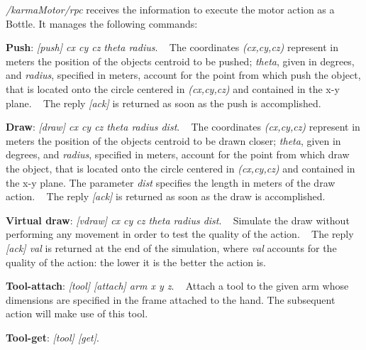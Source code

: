 \begin{DoxyItemize}
\item {\itshape /karma\+Motor/rpc} receives the information to execute the motor action as a Bottle. It manages the following commands\+:
\begin{DoxyEnumerate}
\item {\bfseries Push}\+: {\itshape \mbox{[}push\mbox{]} cx cy cz theta radius}. ~\newline
 The coordinates {\itshape (cx,cy,cz)} represent in meters the position of the object\textquotesingle{}s centroid to be pushed; {\itshape theta}, given in degrees, and {\itshape radius}, specified in meters, account for the point from which push the object, that is located onto the circle centered in {\itshape (cx,cy,cz)} and contained in the x-\/y plane. ~\newline
 The reply {\itshape \mbox{[}ack\mbox{]}} is returned as soon as the push is accomplished.
\item {\bfseries Draw}\+: {\itshape \mbox{[}draw\mbox{]} cx cy cz theta radius dist}. ~\newline
 The coordinates {\itshape (cx,cy,cz)} represent in meters the position of the object\textquotesingle{}s centroid to be drawn closer; {\itshape theta}, given in degrees, and {\itshape radius}, specified in meters, account for the point from which draw the object, that is located onto the circle centered in {\itshape (cx,cy,cz)} and contained in the x-\/y plane. The parameter {\itshape dist} specifies the length in meters of the draw action. ~\newline
 The reply {\itshape \mbox{[}ack\mbox{]}} is returned as soon as the draw is accomplished.
\item {\bfseries Virtual draw}\+: {\itshape \mbox{[}vdraw\mbox{]} cx cy cz theta radius dist}. ~\newline
 Simulate the draw without performing any movement in order to test the quality of the action. ~\newline
 The reply {\itshape \mbox{[}ack\mbox{]} val} is returned at the end of the simulation, where {\itshape val} accounts for the quality of the action\+: the lower it is the better the action is.
\item {\bfseries Tool-\/attach}\+: {\itshape \mbox{[}tool\mbox{]} \mbox{[}attach\mbox{]} arm x y z}. ~\newline
 Attach a tool to the given arm whose dimensions are specified in the frame attached to the hand. The subsequent action will make use of this tool.
\item {\bfseries Tool-\/get}\+: {\itshape \mbox{[}tool\mbox{]} \mbox{[}get\mbox{]}}. ~\newline

\end{DoxyEnumerate}
\end{DoxyItemize}
